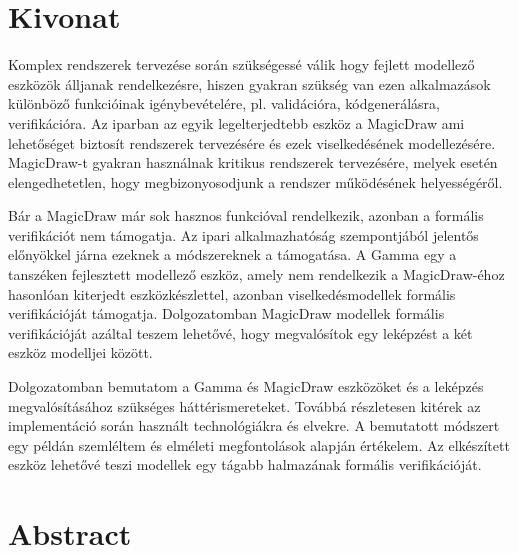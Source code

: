 \setcounter{page}{1}

\selecthungarian

\chapter*{Kivonat}

Komplex rendszerek tervezése során szükségessé válik hogy fejlett modellező eszközök álljanak rendelkezésre, hiszen gyakran szükség van ezen alkalmazások különböző funkcióinak igénybevételére, pl. validációra, kódgenerálásra, verifikációra. Az iparban az egyik legelterjedtebb eszköz a MagicDraw ami lehetőséget biztosít rendszerek tervezésére és ezek viselkedésének modellezésére. MagicDraw-t gyakran használnak kritikus rendszerek tervezésére, melyek esetén elengedhetetlen, hogy megbizonyosodjunk a rendszer működésének helyességéről.

Bár a MagicDraw már sok hasznos funkcióval rendelkezik, azonban a formális verifikációt nem támogatja. Az ipari alkalmazhatóság szempontjából jelentős előnyökkel járna ezeknek a módszereknek a támogatása.
A Gamma egy a tanszéken fejlesztett modellező eszköz, amely nem rendelkezik a MagicDraw-éhoz hasonlóan kiterjedt eszközkészlettel, azonban viselkedésmodellek formális verifikációját támogatja. Dolgozatomban MagicDraw modellek formális verifikációját azáltal teszem lehetővé, hogy megvalósítok egy leképzést a két eszköz modelljei között.

Dolgozatomban bemutatom a Gamma és MagicDraw eszközöket és a leképzés megvalósításához szükséges háttérismereteket. Továbbá részletesen kitérek az implementáció során használt technológiákra és elvekre. A bemutatott módszert egy példán szemléltem és elméleti megfontolások alapján értékelem. Az elkészített eszköz lehetővé teszi modellek egy tágabb halmazának formális verifikációját.


\vfill
\selectenglish


\chapter*{Abstract}

